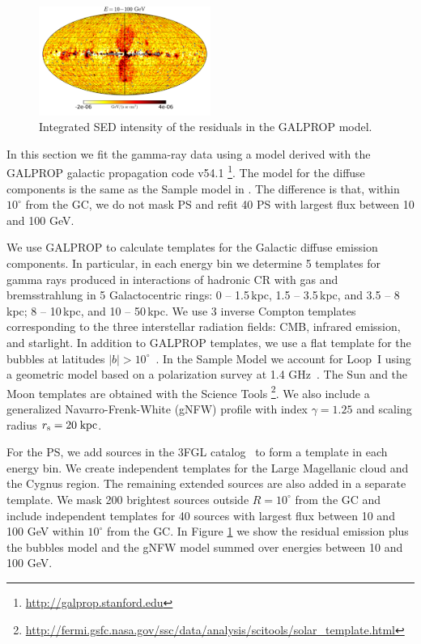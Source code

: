 \begin{figure}[h]
\centering
 \includegraphics[width=0.5\textwidth]{plots/Mollweide_GALPROP_source_range2.pdf}
 \caption{Integrated SED intensity of the residuals in the GALPROP model.}
 \label{fig:Maps_GALPROP}
\end{figure}

In this section we fit the gamma-ray data using a model derived with the GALPROP
galactic propagation code v54.1
\citep{Moskalenko:1997gh, Strong:1998fr, Strong:2004de, Ptuskin:2005ax, 2007ARNPS..57..285S, Porter:2008ve,Vladimirov:2010aq}\footnote{\url{http://galprop.stanford.edu}}. 
The model for the diffuse components is the same as the Sample model in \cite{2017ApJ...840...43A}.
The difference is that, within $10^\circ$ from the GC, we do not mask PS and refit 40 PS with largest 
flux between 10 and 100 GeV.

We use GALPROP to calculate templates for the Galactic diffuse emission components.
In particular, in each energy bin we determine 5 templates for gamma rays produced in 
interactions of hadronic CR with gas and bremsstrahlung in 5 Galactocentric rings: 
0 -- 1.5\,kpc, 1.5 -- 3.5\,kpc, and 3.5 -- 8\,kpc; 8 -- 10\,kpc, and 10 -- 50\,kpc. 
We use 3 inverse Compton templates corresponding to the three interstellar radiation fields: CMB, 
infrared emission, and starlight.
In addition to GALPROP templates, we use a flat template for the \Fermi bubbles at latitudes $|b| > 10^\circ$~\citep{2014ApJ...793...64A}. 
In the Sample Model we account for Loop~I using a geometric model \citep[e.g., Figure 2 of][]{2014ApJ...793...64A}
based on a polarization survey at 1.4 GHz~\citep{Wolleben:2007pq}.
The Sun \citep{2007Ap&SS.309..359O, 2006ApJ...652L..65M, 2008A&A...480..847O, 2013arXiv1307.0197J} and the Moon templates are obtained with the \Fermi Science Tools%
\footnote{\url{http://fermi.gsfc.nasa.gov/ssc/data/analysis/scitools/solar_template.html}}.
We also include a generalized Navarro-Frenk-White (gNFW) profile with index $\gamma = 1.25$ and scaling radius $r_{\rm s} = 20\;{\rm kpc}$.


For the PS, we add sources in the 3FGL catalog~\citep{2015ApJS..218...23A} to form a template
in each energy bin.
We create independent templates for the Large Magellanic cloud and the Cygnus region.
The remaining extended sources are also added in a separate template.
We mask 200 brightest sources outside $R = 10^\circ$ from the GC and include independent templates
for 40 sources with largest flux between 10 and 100 GeV within $10^\circ$ from the GC.
In Figure \ref{fig:Maps_GALPROP} we show the residual emission plus the \Fermi bubbles model and the gNFW model summed over energies between 10 and 100 GeV.



